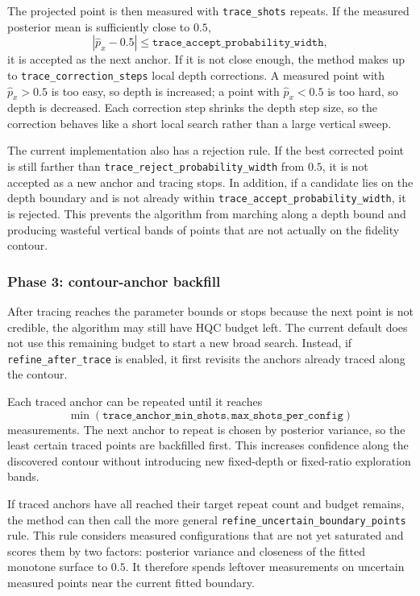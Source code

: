 The projected point is then measured with \texttt{trace\_shots} repeats.  If
the measured posterior mean is sufficiently close to \(0.5\),
\[
    |\widehat p_x - 0.5|
    \leq
    \texttt{trace\_accept\_probability\_width},
\]
it is accepted as the next anchor.  If it is not close enough, the method makes
up to \texttt{trace\_correction\_steps} local depth corrections.  A measured
point with \(\widehat p_x>0.5\) is too easy, so depth is increased; a point with
\(\widehat p_x<0.5\) is too hard, so depth is decreased.  Each correction step
shrinks the depth step size, so the correction behaves like a short local
search rather than a large vertical sweep.

The current implementation also has a rejection rule.  If the best corrected
point is still farther than
\texttt{trace\_reject\_probability\_width} from \(0.5\), it is not accepted as
a new anchor and tracing stops.  In addition, if a candidate lies on the depth
boundary and is not already within
\texttt{trace\_accept\_probability\_width}, it is rejected.  This prevents the
algorithm from marching along a depth bound and producing wasteful vertical
bands of points that are not actually on the fidelity contour.

\subsubsection{Phase 3: contour-anchor backfill}

After tracing reaches the parameter bounds or stops because the next point is
not credible, the algorithm may still have HQC budget left.  The current
default does not use this remaining budget to start a new broad search.
Instead, if \texttt{refine\_after\_trace} is enabled, it first revisits the
anchors already traced along the contour.

Each traced anchor can be repeated until it reaches
\[
    \min(
        \texttt{trace\_anchor\_min\_shots},
        \texttt{max\_shots\_per\_config}
    )
\]
measurements.  The next anchor to repeat is chosen by posterior variance, so
the least certain traced points are backfilled first.  This increases
confidence along the discovered contour without introducing new fixed-depth or
fixed-ratio exploration bands.

If traced anchors have all reached their target repeat count and budget remains,
the method can then call the more general
\texttt{refine\_uncertain\_boundary\_points} rule.  This rule considers measured
configurations that are not yet saturated and scores them by two factors:
posterior variance and closeness of the fitted monotone surface to \(0.5\).  It
therefore spends leftover measurements on uncertain measured points near the
current fitted boundary.

